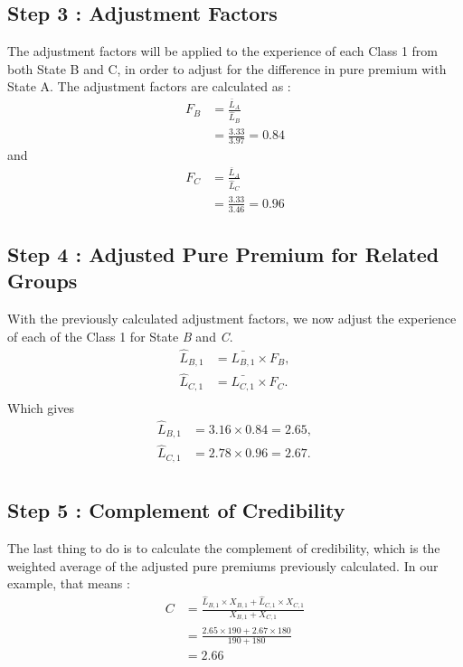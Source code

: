 \documentclass[11pt, english]{memoir}
\numberwithin{definition}{section}
\newcommand{\mean}[1]{\bar{#1}}
\begin{document}
\subsection*{Step 3 : Adjustment Factors}
The adjustment factors will be applied to the experience of each Class 1 from both State B and C, in order to adjust for the difference in pure premium with State A. The adjustment factors are calculated as : 
\begin{align*}
F_{B} 	&= \frac{\mean{L}_{A}}{\hat{L}_{B}}\\
		&= \frac{3.33}{3.97} = 0.84
\end{align*}
and 
\begin{align*}
F_{C} 	&= \frac{\mean{L}_{A}}{\hat{L}_{C}}\\
		&= \frac{3.33}{3.46} = 0.96
\end{align*}


\subsection*{Step 4 : Adjusted Pure Premium for Related Groups}
With the previously calculated adjustment factors, we now adjust the experience of each of the Class 1 for State \emph{B} and \emph{C}. 
\begin{align*}
\hat{L}_{B, 1} &= \mean{L_{B,1}} \times F_{B},\\
\hat{L}_{C, 1} &= \mean{L_{C,1}} \times F_{C}.\\
\end{align*}
Which gives 
\begin{align*}
\hat{L}_{B, 1} &=  3.16 \times 0.84 = 2.65,\\
\hat{L}_{C, 1} &= 2.78 \times 0.96 = 2.67.\\
\end{align*}


\subsection*{Step 5 : Complement of Credibility}

The last thing to do is to calculate the complement of credibility, which is the weighted average of the adjusted pure premiums previously calculated. In our example, that means : 
\begin{align*}
C 	&= \frac{\hat{L}_{B,1} \times X_{B,1} + \hat{L}_{C,1} \times X_{C,1}}{X_{B,1} + X_{C, 1}}\\
	&= \frac{2.65\times 190 + 2.67 \times 180}{190+180}\\
	&= 2.66
\end{align*}
\end{document}

